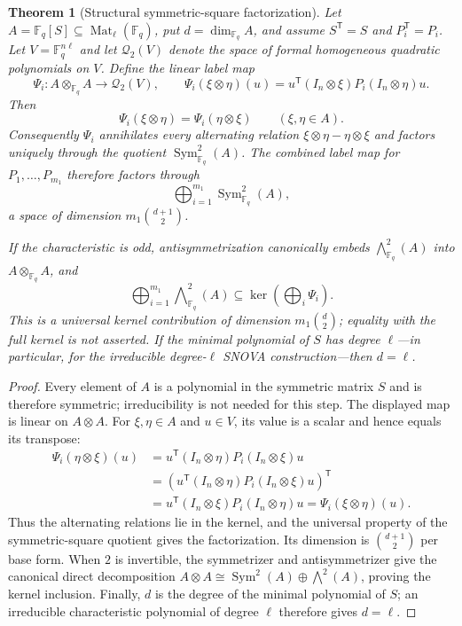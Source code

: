 \documentclass[11pt]{article}
\newtheorem{theorem}{Theorem}
\newcommand{\F}{\mathbb F}
\newcommand{\Mat}{\operatorname{Mat}}
\newcommand{\Sym}{\operatorname{Sym}}
\newcommand{\transpose}{\mathsf T}
\newcommand{\SNOVA}{\textsf{SNOVA}}
\begin{document}
\begin{theorem}[Structural symmetric-square factorization]\label{thm:structural-sym2}
Let $A=\F_q[S]\subseteq\Mat_\ell(\F_q)$, put $d=\dim_{\F_q}A$, and assume $S^\transpose=S$ and $P_i^\transpose=P_i$.  Let $V=\F_q^{n\ell}$ and let $\mathcal Q_2(V)$ denote the space of formal homogeneous quadratic polynomials on $V$.  Define the linear label map
\[
 \Psi_i:A\otimes_{\F_q}A\longrightarrow\mathcal Q_2(V),
 \qquad
 \Psi_i(\xi\otimes\eta)(u)
 =u^\transpose(I_n\otimes\xi)P_i(I_n\otimes\eta)u.
\]
Then
\[
 \Psi_i(\xi\otimes\eta)=\Psi_i(\eta\otimes\xi)
 \qquad(\xi,\eta\in A).
\]
Consequently $\Psi_i$ annihilates every alternating relation
$\xi\otimes\eta-\eta\otimes\xi$ and factors uniquely through the quotient
$\Sym^2_{\F_q}(A)$.  The combined label map for
$P_1,\ldots,P_{m_1}$ therefore factors through
\[
 \bigoplus_{i=1}^{m_1}\Sym^2_{\F_q}(A),
\]
a space of dimension $m_1\binom{d+1}{2}$.

If the characteristic is odd, antisymmetrization canonically embeds
$\bigwedge^2_{\F_q}(A)$ into $A\otimes_{\F_q}A$, and
\[
 \bigoplus_{i=1}^{m_1}\bigwedge\nolimits^2_{\F_q}(A)
 \subseteq \ker\!\left(\bigoplus_i\Psi_i\right).
\]
This is a universal kernel contribution of dimension
$m_1\binom d2$; equality with the full kernel is not asserted.  If the
minimal polynomial of $S$ has degree $\ell$---in particular, for the
irreducible degree-$\ell$ \SNOVA{} construction---then $d=\ell$.
\end{theorem}

\begin{proof}
Every element of $A$ is a polynomial in the symmetric matrix $S$ and is
therefore symmetric; irreducibility is not needed for this step.  The displayed
map is linear on $A\otimes A$.  For $\xi,\eta\in A$ and $u\in V$, its value is
a scalar and hence equals its transpose:
\[
\begin{aligned}
 \Psi_i(\eta\otimes\xi)(u)
 &=u^\transpose(I_n\otimes\eta)P_i(I_n\otimes\xi)u\\
 &=\left(u^\transpose(I_n\otimes\eta)P_i(I_n\otimes\xi)u\right)^\transpose\\
 &=u^\transpose(I_n\otimes\xi)P_i(I_n\otimes\eta)u
 =\Psi_i(\xi\otimes\eta)(u).
\end{aligned}
\]
Thus the alternating relations lie in the kernel, and the universal property
of the symmetric-square quotient gives the factorization.  Its dimension is
$\binom{d+1}{2}$ per base form.  When $2$ is invertible, the symmetrizer and
antisymmetrizer give the canonical direct decomposition
$A\otimes A\cong\Sym^2(A)\oplus\bigwedge^2(A)$, proving the kernel inclusion.
Finally, $d$ is the degree of the minimal polynomial of $S$; an irreducible
characteristic polynomial of degree $\ell$ therefore gives $d=\ell$.
\end{proof}
\end{document}
